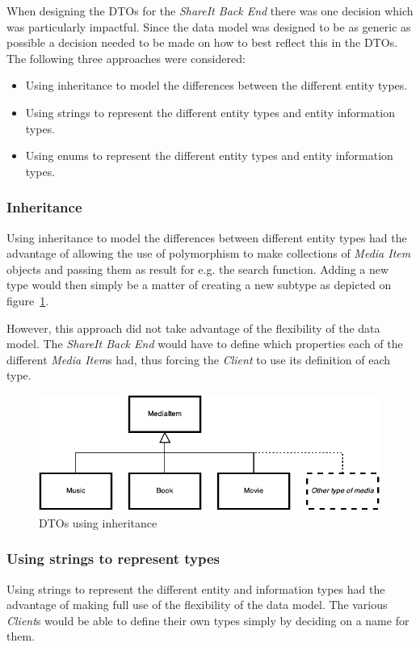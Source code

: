 \documentclass[../report.tex]{subfiles}
\begin{document}
\graphicspath{{img/}{../img/}}
\label{sec:enums}

When designing the DTOs for the \textit{ShareIt Back End} there was one decision which was particularly impactful.
Since the data model was designed to be as generic as possible a decision needed to be made on how to best reflect this in the DTOs.
The following three approaches were considered:
\begin{itemize}
\item Using inheritance to model the differences between the different entity types.
\item Using strings to represent the different entity types and entity information types.
\item Using enums to represent the different entity types and entity information types.
\end{itemize}

\subsubsection{Inheritance}
Using inheritance to model the differences between different entity types had the advantage of allowing the use of polymorphism to make collections of \textit{Media Item} objects and passing them as result for e.g. the search function. Adding a new type would then simply be a matter of creating a new subtype as depicted on figure~\ref{fig:dto_inheritance}.
 
However, this approach did not take advantage of the flexibility of the data model. The \textit{ShareIt Back End} would have to define which properties each of the different \textit{Media Item}s had, thus forcing the \textit{Client} to use its definition of each type.

\begin{figure}[!h]
\centering
\includegraphics[scale=0.7]{DTOInheritance.pdf}
\caption{DTOs using inheritance}
\label{fig:dto_inheritance}
\end{figure}

\subsubsection{Using strings to represent types}
Using strings to represent the different entity and information types had the advantage of making full use of the flexibility of the data model. The various \textit{Client}s would be able to define their own types simply by deciding on a name for them. 
\end{document}
